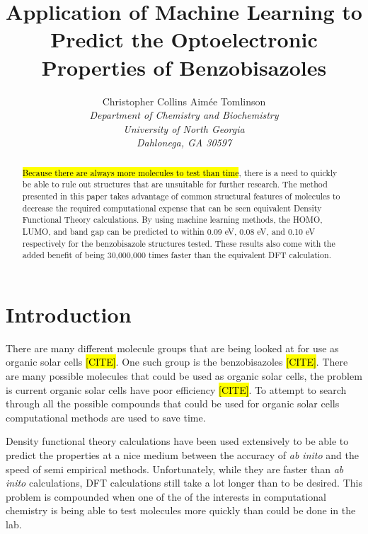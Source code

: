 \documentclass[10pt]{article}
\begin{document}
\title{Application of Machine Learning to Predict the Optoelectronic Properties of Benzobisazoles}
\author{Christopher Collins \qquad Aim\'{e}e Tomlinson\\
        \emph{Department of Chemistry and Biochemistry}\\
        \emph{University of North Georgia}\\
        \emph{Dahlonega, GA 30597}}

\maketitle

\begin{abstract}
\hl{Because there are always more molecules to test than time}, there is a need to quickly be able to rule out structures that are unsuitable for further research. The method presented in this paper takes advantage of common structural features of molecules to decrease the required computational expense that can be seen equivalent Density Functional Theory calculations. By using machine learning methods, the HOMO, LUMO, and band gap can be predicted to within 0.09 eV, 0.08 eV, and 0.10 eV respectively for the benzobisazole structures tested. These results also come with the added benefit of being 30,000,000 times faster than the equivalent DFT calculation.
\end{abstract}

\section{Introduction}

There are many different molecule groups that are being looked at for use as organic solar cells \hl{[CITE]}. One such group is the benzobisazoles \hl{[CITE]}. There are many possible molecules that could be used as organic solar cells, the problem is current organic solar cells have poor efficiency \hl{[CITE]}. To attempt to search through all the possible compounds that could be used for organic solar cells computational methods are used to save time.

Density functional theory calculations have been used extensively to be able to predict the properties at a nice medium between the accuracy of \emph{ab inito} and the speed of semi empirical methods. Unfortunately, while they are faster than \emph{ab inito} calculations, DFT calculations still take a lot longer than to be desired. This problem is compounded when one of the of the interests in computational chemistry is being able to test molecules more quickly than could be done in the lab.
\end{document}
